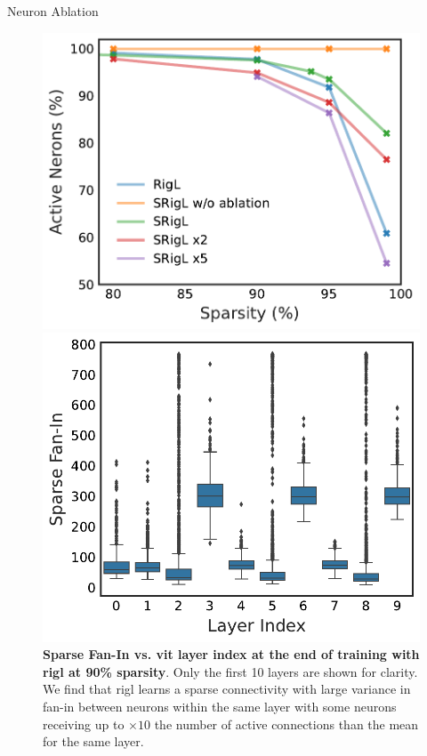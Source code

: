 \documentclass[final]{beamer}
\newlength{\colwidth}
\begin{document}
\begin{frame}[t]
\begin{columns}[t]
\begin{column}{\colwidth}
\begin{block}{Neuron Ablation}
\begin{figure}
    \begin{minipage}[t]{.48\colwidth}
        \includegraphics[width=0.49\colwidth]{srigl_example_figs/imagenet_perc_active.pdf}
        \caption{Neuron Ablation}\label{fig:imagenet_perc_active}
    \end{minipage}
    \hfill
    \begin{minipage}[t]{.48\colwidth}
        \includegraphics[width=0.48\colwidth]{srigl_example_figs/vit_rigl_fan_in.pdf}
        \caption{\textbf{Sparse Fan-In vs. \gls{vit} layer index at the end of training with \gls{rigl} at 90\% sparsity}. Only the first 10 layers are shown for clarity. We find that \gls{rigl} learns a sparse connectivity with large variance in fan-in between neurons within the same layer with some neurons receiving up to $\times 10$ the number of active connections than the mean for the same layer.}\label{fig:vit-rigl-fan-in}
    \end{minipage}
\end{figure}



\end{block}
\end{column}
\end{columns}
\end{frame}
\end{document}
